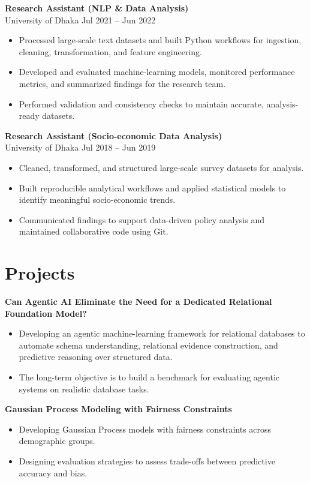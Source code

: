 \documentclass[10pt, letterpaper]{article}
\begin{document}
   \textbf{Research Assistant (NLP \& Data Analysis)} \\
   University of Dhaka \hfill Jul 2021 -- Jun 2022
   \begin{itemize}
    \item Processed large-scale text datasets and built Python workflows for ingestion, cleaning, transformation, and feature engineering.
    \item Developed and evaluated machine-learning models, monitored performance metrics, and summarized findings for the research team.
    \item Performed validation and consistency checks to maintain accurate, analysis-ready datasets.
\end{itemize}

\textbf{Research Assistant (Socio-economic Data Analysis)} \\
University of Dhaka \hfill Jul 2018 -- Jun 2019
\begin{itemize}
    \item Cleaned, transformed, and structured large-scale survey datasets for analysis.
    \item Built reproducible analytical workflows and applied statistical models to identify meaningful socio-economic trends.
    \item Communicated findings to support data-driven policy analysis and maintained collaborative code using Git.
\end{itemize}

    
    \section*{Projects}
    \textbf{Can Agentic AI Eliminate the Need for a Dedicated Relational Foundation Model?}
    \begin{itemize}
        \item Developing an agentic machine-learning framework for relational databases to automate schema understanding, relational evidence construction, and predictive reasoning over structured data.
        \item The long-term objective is to build a benchmark for evaluating agentic systems on realistic database tasks.
    \end{itemize}

    \textbf{Gaussian Process Modeling with Fairness Constraints} \\
    \begin{itemize}
    \item Developing Gaussian Process models with fairness constraints across demographic groups.
    \item Designing evaluation strategies to assess trade-offs between predictive accuracy and bias.
    \end{itemize}
\end{document}
